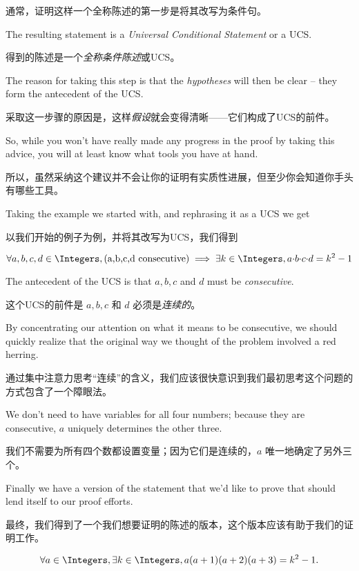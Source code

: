 通常，证明这样一个全称陈述的第一步是将其改写为条件句。

The resulting statement is a 
\emph{Universal Conditional Statement} 
or a UCS.

得到的陈述是一个\emph{全称条件陈述}或UCS。

The reason for taking 
this step is that the \emph{hypotheses} will then be clear -- they form 
the antecedent of the UCS.

采取这一步骤的原因是，这样\emph{假设}就会变得清晰——它们构成了UCS的前件。

So, while you won't have really made any 
progress in the proof by taking this advice, you will at least know what tools
you have at hand.

所以，虽然采纳这个建议并不会让你的证明有实质性进展，但至少你会知道你手头有哪些工具。

Taking the example we started with, and rephrasing 
it as a UCS we get

以我们开始的例子为例，并将其改写为UCS，我们得到

\[ \forall a,b,c,d \in \Integers, (\mbox{a,b,c,d  consecutive}) 
\implies \exists k \in \Integers, a{\cdot}b{\cdot}c{\cdot}d = k^2 -1 
\]

The antecedent of the UCS is that $a,b,c$ and $d$ must be 
{\em consecutive}.

这个UCS的前件是 $a,b,c$ 和 $d$ 必须是{\em 连续的}。

By concentrating our attention on what it 
means to be consecutive, we should quickly realize that the original
way we thought of the problem involved a red herring.

通过集中注意力思考“连续”的含义，我们应该很快意识到我们最初思考这个问题的方式包含了一个障眼法。

We don't need 
to have variables for all four numbers; because they are consecutive, 
$a$ uniquely determines the other three.

我们不需要为所有四个数都设置变量；因为它们是连续的，$a$ 唯一地确定了另外三个。

Finally we have a version 
of the statement that we'd like to prove that should lend itself
to our proof efforts.

最终，我们得到了一个我们想要证明的陈述的版本，这个版本应该有助于我们的证明工作。

\begin{thm} 
\[ \forall a \in \Integers, \exists k \in \Integers, 
a(a+1)(a+2)(a+3) = k^2 - 1. \]
\end{thm}

